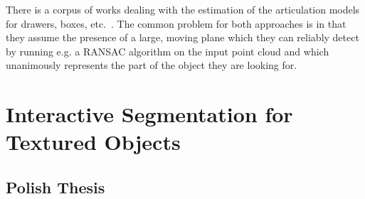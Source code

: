 There is a corpus of works dealing with the estimation of the
articulation models for drawers, boxes, etc.~\cite{Box11Saxena,
  sturm10rss-workshop}. The common problem for both approaches is in
that they assume the presence of a large, moving plane which they can
reliably detect by running e.g. a RANSAC algorithm on the input point
cloud and which unanimously represents the part of the object they are
looking for.

\section{Interactive Segmentation for Textured Objects}


\subsection{Polish Thesis}